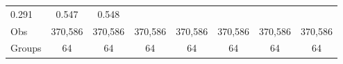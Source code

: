 \documentclass[12pt,twoside]{reedthesis}
\begin{document}
\begin{longtable}[]{@{}lccccccc@{}}
\begin{minipage}[t]{0.10\columnwidth}
  0.291\strut
  \end{minipage} & \begin{minipage}[t]{0.10\columnwidth}\centering\strut
  0.547\strut
  \end{minipage} & \begin{minipage}[t]{0.10\columnwidth}\centering\strut
  0.548\strut
  \end{minipage}\tabularnewline
  \begin{minipage}[t]{0.12\columnwidth}\raggedright\strut
  Obs\strut
  \end{minipage} & \begin{minipage}[t]{0.09\columnwidth}\centering\strut
  370,586\strut
  \end{minipage} & \begin{minipage}[t]{0.10\columnwidth}\centering\strut
  370,586\strut
  \end{minipage} & \begin{minipage}[t]{0.10\columnwidth}\centering\strut
  370,586\strut
  \end{minipage} & \begin{minipage}[t]{0.10\columnwidth}\centering\strut
  370,586\strut
  \end{minipage} & \begin{minipage}[t]{0.10\columnwidth}\centering\strut
  370,586\strut
  \end{minipage} & \begin{minipage}[t]{0.10\columnwidth}\centering\strut
  370,586\strut
  \end{minipage} & \begin{minipage}[t]{0.10\columnwidth}\centering\strut
  370,586\strut
  \end{minipage}\tabularnewline
  \begin{minipage}[t]{0.12\columnwidth}\raggedright\strut
  Groups\strut
  \end{minipage} & \begin{minipage}[t]{0.09\columnwidth}\centering\strut
  64\strut
  \end{minipage} & \begin{minipage}[t]{0.10\columnwidth}\centering\strut
  64\strut
  \end{minipage} & \begin{minipage}[t]{0.10\columnwidth}\centering\strut
  64\strut
  \end{minipage} & \begin{minipage}[t]{0.10\columnwidth}\centering\strut
  64\strut
  \end{minipage} & \begin{minipage}[t]{0.10\columnwidth}\centering\strut
  64\strut
  \end{minipage} & \begin{minipage}[t]{0.10\columnwidth}\centering\strut
  64\strut
  \end{minipage} & \begin{minipage}[t]{0.10\columnwidth}\centering\strut
  64\strut
  \end{minipage}\tabularnewline
  \bottomrule
  \end{longtable}
  
\end{document}
